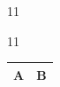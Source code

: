 \documentclass[paper=A4]{ropas-poster}
\begin{document}
\begin{postergrid}{1}{1}
\begin{posterblock}{1}{1}
\begin{tabular}{|c|c|}\hline A&B\\\hline\end{tabular}
\end{posterblock}
\end{postergrid}
\end{document}
